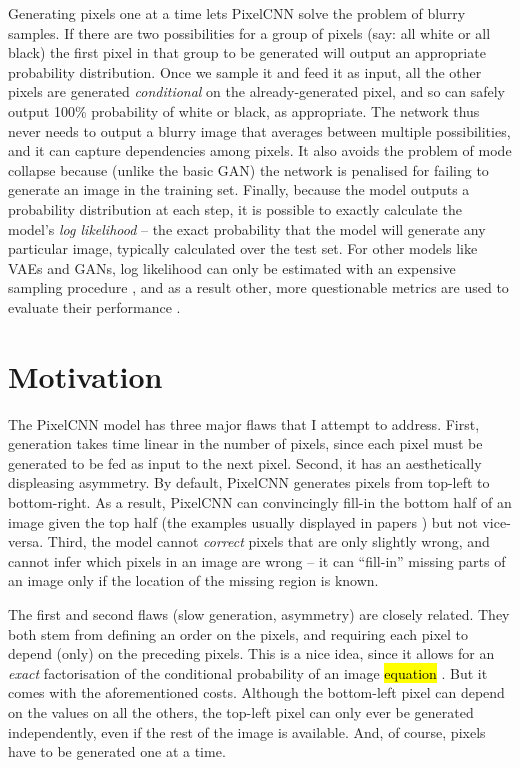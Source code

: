 \documentclass[10pt,a4paper]{article}
\newcommand{\nquote}[1]{``{#1}''}
\begin{document}
Generating pixels one at a time lets PixelCNN solve the problem of blurry samples. If there are two possibilities for a group of pixels (say: all white or all black) the first pixel in that group to be generated will output an appropriate probability distribution. Once we sample it and feed it as input, all the other pixels are generated \emph{conditional} on the already-generated pixel, and so can safely output 100\% probability of white or black, as appropriate. The network thus never needs to output a blurry image that averages between multiple possibilities, and it can capture dependencies among pixels. It also avoids the problem of mode collapse because (unlike the basic GAN) the network is penalised for failing to generate an image in the training set. Finally, because the model outputs a probability distribution at each step, it is possible to exactly calculate the model's \emph{log likelihood} \cite{??} -- the exact probability that the model will generate any particular image, typically calculated over the test set. For other models like VAEs and GANs, log likelihood can only be estimated with an expensive sampling procedure \cite{??}, and as a result other, more questionable metrics are used to evaluate their performance \cite{??}.

\section{Motivation}

The PixelCNN model has three major flaws that I attempt to address. First, generation takes time linear in the number of pixels, since each pixel must be generated to be fed as input to the next pixel. Second, it has an aesthetically displeasing asymmetry. By default, PixelCNN generates pixels from top-left to bottom-right. As a result, PixelCNN can convincingly fill-in the bottom half of an image given the top half (the examples usually displayed in papers \cite{??}\cite{??}\cite{??}) but not vice-versa. Third, the model cannot \emph{correct} pixels that are only slightly wrong, and cannot infer which pixels in an image are wrong -- it can \nquote{fill-in} missing parts of an image only if the location of the missing region is known.

The first and second flaws (slow generation, asymmetry) are closely related. They both stem from defining an order on the pixels, and requiring each pixel to depend (only) on the preceding pixels. This is a nice idea, since it allows for an \emph{exact} factorisation of the conditional probability of an image \hl{equation} \cite{??}. But it comes with the aforementioned costs. Although the bottom-left pixel can depend on the values on all the others, the top-left pixel can only ever be generated independently, even if the rest of the image is available. And, of course, pixels have to be generated one at a time.
\end{document}
